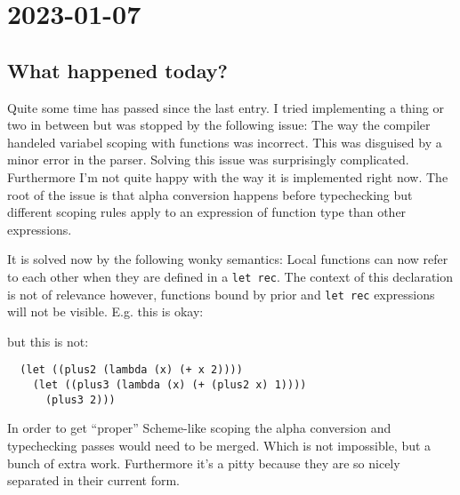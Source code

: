 \documentclass[12pt, article]{article}
\begin{document}
\section{2023-01-07}

\subsection{What happened today?}

Quite some time has passed since the last entry.
I tried implementing a thing or two in between but was stopped by the
following issue:
The way the compiler handeled variabel scoping with functions was
incorrect.
This was disguised by a minor error in the parser.
Solving this issue was surprisingly complicated.
Furthermore I'm not quite happy with the way it is implemented right
now.
The root of the issue is that alpha conversion happens before
typechecking but different scoping rules apply to an expression of
function type than other expressions.

It is solved now by the following wonky semantics:
Local functions can now refer to each other when they are defined in a
\lstinline{let rec}.
The context of this declaration is not of relevance however, functions
bound by prior  and \lstinline{let rec} expressions
will not be visible.
E.g. this is okay:



but this is not:

\begin{lstlisting}
  (let ((plus2 (lambda (x) (+ x 2))))
    (let ((plus3 (lambda (x) (+ (plus2 x) 1))))
      (plus3 2)))
\end{lstlisting}

In order to get ``proper'' Scheme-like scoping the alpha conversion
and typechecking passes would need to be merged.
Which is not impossible, but a bunch of extra work.
Furthermore it's a pitty because they are so nicely separated in their
current form.
\end{document}
